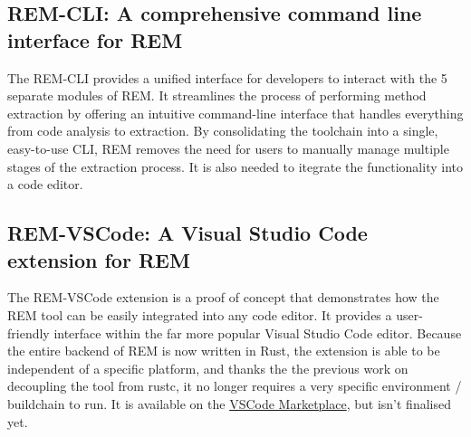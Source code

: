 \subsection*{REM-CLI: A comprehensive command line interface for REM}

The REM-CLI provides a unified interface for developers to interact with the
5 separate modules of REM. It streamlines the process of performing method
extraction by offering an intuitive command-line interface that handles
everything from code analysis to extraction. By consolidating the toolchain into
a single, easy-to-use CLI, REM removes the need for users to manually manage
multiple stages of the extraction process. It is also needed to itegrate the
functionality into a code editor.

\subsection*{REM-VSCode: A Visual Studio Code extension for REM}

The REM-VSCode extension is a proof of concept that demonstrates how the REM
tool can be easily integrated into any code editor. It provides a user-friendly interface
within the far more popular Visual Studio Code editor. Because the entire
backend of REM is now written in Rust, the extension is able to be independent
of a specific platform, and thanks the the previous work on decoupling the tool
from rustc, it no longer requires a very specific environment / buildchain to
run. It is available on the
\href{https://marketplace.visualstudio.com/items?itemName=MatthewBritton.remvscode&ssr=false#overview}{VSCode
Marketplace}, but isn't finalised yet.